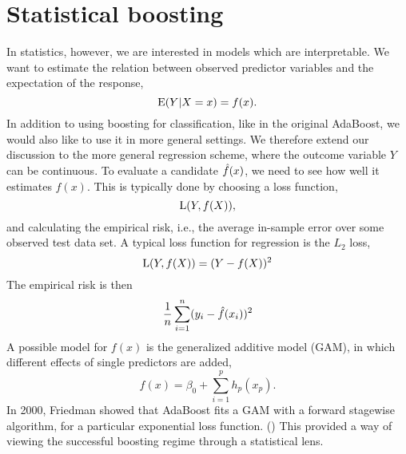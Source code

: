 \section{Statistical boosting}\label{sec:sboost}
In statistics, however, we are interested in models which are interpretable. We want to estimate the relation between observed predictor variables and the expectation of the response,
\begin{equation*}
    \operatorname{E}(Y|X=x)=f(x).
\end{equation*}
In addition to using boosting for classification, like in the original AdaBoost, we would also like to use it in more general settings. We therefore extend our discussion to the more general regression scheme, where the outcome variable $Y$ can be continuous. To evaluate a candidate $\hat{f}(x)$, we need to see how well it estimates $f(x)$. This is typically done by choosing a loss function,
\begin{equation}\label{eq:loss}
    \operatorname{L}(Y, f(X)),
\end{equation}
and calculating the empirical risk, i.e., the average in-sample error over some observed test data set. A typical loss function for regression is the $L_2$ loss,
\begin{equation*}
    \operatorname{L}(Y, f(X))=(Y-f(X))^2
\end{equation*}
The empirical risk is then
\begin{equation*}
    \frac{1}{n}\sum_{i=1}^n (y_i-\hat{f}(x_i))^2
\end{equation*}
A possible model for $f(x)$ is the generalized additive model (GAM), in which different effects of single predictors are added,
\begin{equation}\label{eq:gam}
    f(x)=\beta_0+\sum_{i=1}^p h_p(x_p).
\end{equation}
In 2000, Friedman showed that AdaBoost fits a GAM with a forward stagewise algorithm, for a particular exponential loss function. (\cite{friedman2000}) This provided a way of viewing the successful boosting regime through a statistical lens.

